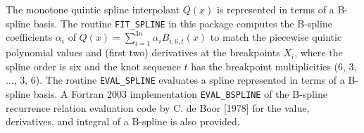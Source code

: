 
The monotone quintic spline interpolant $Q(x)$ is represented in terms of
a B-spline basis. The routine {\tt FIT\_SPLINE} in this package computes
the B-spline coefficients $\alpha_i$ of $Q(x)=\sum_{i=1}^{3n} \alpha_i
B_{i,6,t}(x)$ to match the piecewise quintic polynomial values and (first
two) derivatives at the breakpoints $X_i$, where the spline order is six
and the knot sequence $t$ has the breakpoint multiplicities (6, 3, $\ldots$,
3, 6).  The routine {\tt EVAL\_SPLINE} evaluates a spline represented in
terms of a B-spline basis. A Fortran 2003 implementation {\tt EVAL\_BSPLINE}
of the B-spline recurrence relation evaluation code by C. de Boor [1978]
for the value, derivatives, and integral of a B-spline is also provided.
